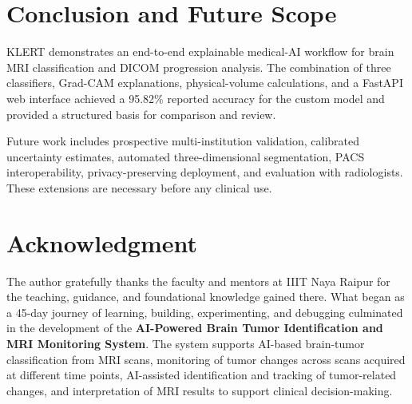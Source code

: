 \documentclass[conference]{IEEEtran}
\begin{document}
\section{Conclusion and Future Scope}
KLERT demonstrates an end-to-end explainable medical-AI workflow for brain MRI classification and DICOM progression analysis. The combination of three classifiers, Grad-CAM explanations, physical-volume calculations, and a FastAPI web interface achieved a 95.82\% reported accuracy for the custom model and provided a structured basis for comparison and review.

Future work includes prospective multi-institution validation, calibrated uncertainty estimates, automated three-dimensional segmentation, PACS interoperability, privacy-preserving deployment, and evaluation with radiologists. These extensions are necessary before any clinical use.

\section*{Acknowledgment}
The author gratefully thanks the faculty and mentors at IIIT Naya Raipur for the teaching, guidance, and foundational knowledge gained there. What began as a 45-day journey of learning, building, experimenting, and debugging culminated in the development of the \textbf{AI-Powered Brain Tumor Identification and MRI Monitoring System}. The system supports AI-based brain-tumor classification from MRI scans, monitoring of tumor changes across scans acquired at different time points, AI-assisted identification and tracking of tumor-related changes, and interpretation of MRI results to support clinical decision-making.



\end{document}
